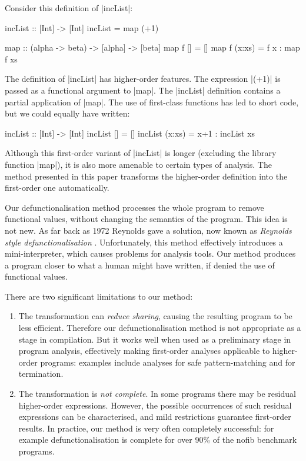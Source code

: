 \documentclass[preprint]{sigplanconf}
\begin{document}
\begin{example}
\label{ex:incList}

Consider this definition of |incList|:

\begin{code}
incList :: [Int] -> [Int]
incList = map (+1)

map :: (alpha -> beta) -> [alpha] -> [beta]
map f []      = []
map f (x:xs)  = f x : map f xs
\end{code}

The definition of |incList| has higher-order features. The expression |(+1)| is passed as a functional argument to |map|. The |incList| definition contains a partial application of |map|. The use of first-class functions has led to short code, but we could equally have written:

\begin{code}
incList :: [Int] -> [Int]
incList []      = []
incList (x:xs)  = x+1 : incList xs
\end{code}

Although this first-order variant of |incList| is longer (excluding the library function |map|), it is also more amenable to certain types of analysis. The method presented in this paper transforms the higher-order definition into the first-order one automatically.
\end{example}

\smallskip

Our defunctionalisation method processes the whole program to remove functional values, without changing the semantics of the program. This idea is not new. As far back as 1972 Reynolds gave a solution, now known as \textit{Reynolds style defunctionalisation} \cite{reynolds:defunc}. Unfortunately, this method effectively introduces a mini-interpreter, which causes problems for analysis tools. Our method produces a program closer to what a human might have written, if denied the use of functional values.

There are two significant limitations to our method:

\negsmallskip

\begin{enumerate}
\item The transformation can \textit{reduce sharing}, causing the resulting program to be less efficient.  Therefore our defunctionalisation method is not appropriate as a  stage in compilation.  But it works well when used as a preliminary stage in program analysis, effectively making first-order analyses applicable to higher-order programs: examples include analyses for safe pattern-matching and for termination.
\item The transformation is \textit{not complete}.  In some programs there may be residual higher-order expressions.  However, the possible occurrences of such residual expressions can be characterised, and mild restrictions guarantee first-order results.  In practice, our method is very often completely successful: for example defunctionalisation is complete for over 90\% of the nofib benchmark programs.
\end{enumerate}
\end{document}
